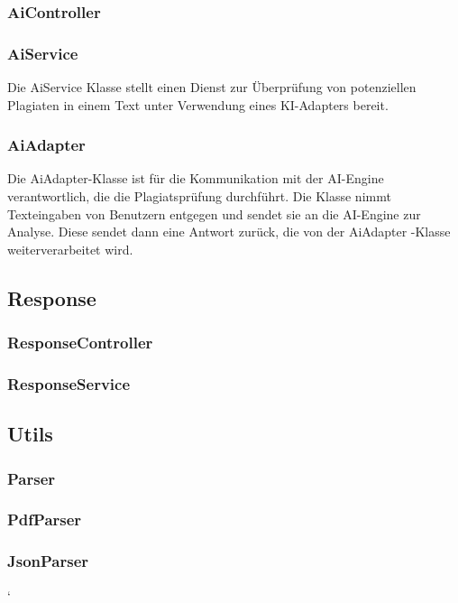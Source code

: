 \subsubsection{AiController}\label{subsubsec:ai_controller}

\subsubsection{AiService}\label{subsubsec:ai_service}
Die AiService Klasse stellt einen Dienst zur Überprüfung von potenziellen Plagiaten in einem Text unter Verwendung eines KI-Adapters bereit.

\subsubsection{AiAdapter}\label{subsubsec:ai_adapter}
Die AiAdapter-Klasse ist für die Kommunikation mit der AI-Engine verantwortlich, die die Plagiatsprüfung durchführt.
Die Klasse nimmt Texteingaben von Benutzern entgegen und sendet sie an die AI-Engine zur Analyse.
Diese sendet dann eine Antwort zurück, die von der AiAdapter -Klasse weiterverarbeitet wird.

\subsection{Response}\label{subsec:response}

\subsubsection{ResponseController}\label{subsubsec:response_controller}

\subsubsection{ResponseService}\label{subsubsec:response_service}

\subsection{Utils}\label{subsec:utils}

\subsubsection{Parser}\label{subsubsec:parser}

\subsubsection{PdfParser}\label{subsubsec:pdf_parser}

\subsubsection{JsonParser}\label{subsubsec:json_parser}`